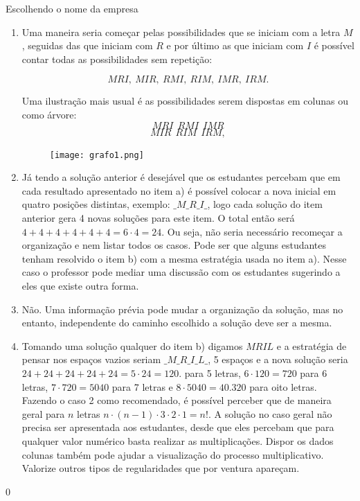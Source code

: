 \begin{answer}{Escolhendo o nome da empresa}
{
\begin{enumerate}
\item Uma maneira seria começar pelas possibilidades que se iniciam com a letra $M$, seguidas das que iniciam com $R$ e por último as que iniciam com $I$ é possível contar todas as possibilidades sem repetição: 
                    
$$MRI, ~ MIR, ~ RMI, ~ RIM, ~ IMR, ~ IRM.$$

Uma ilustração mais usual é as possibilidades serem dispostas em colunas ou como árvore: 
$$MRI ~~ RMI~~IMR$$ 
$$MIR ~~ RIM~~IRM ,$$                     
\begin{figure}[H]
\centering

\texttt{[image: grafo1.png]}
\end{figure}
\item Já tendo a solução anterior é desejável que os estudantes percebam que em cada resultado apresentado no item a) é possível colocar a nova inicial em quatro posições distintas, exemplo: 
$\_ M \_ R\_ I \_ $, logo cada solução do item anterior gera 4 novas soluções para este item. O total então será $4+4+4+4+4+4= 6 \cdot 4=24$. Ou seja, não seria necessário recomeçar a organização e nem listar todos os casos. Pode ser que alguns estudantes tenham resolvido o item b) com a mesma estratégia usada no item a). Nesse caso o professor pode mediar uma discussão com os estudantes sugerindo a eles que existe outra forma. 

\item Não. Uma informação prévia pode mudar a organização da solução, mas no entanto, independente do caminho escolhido a solução deve ser a mesma. 

\item Tomando uma solução qualquer do item b) digamos $MRIL$ e a estratégia de pensar nos espaços vazios seriam $\_M\_R\_I\_L\_$,  5 espaços e a nova solução seria $24+24+24+24+24=5 \cdot 24=  120.$ para 5 letras, $6 \cdot 120= 720$ para 6 letras, $7\cdot 720=5040$ para 7 letras e $8 \cdot 5040= 40.320$ para oito letras. Fazendo o caso 2 como recomendado, é possível perceber que de maneira geral para $n$ letras 
$n \cdot (n-1) \cdot 3 \cdot 2 \cdot 1= n!$.
A solução no caso geral não precisa ser apresentada aos estudantes, desde que eles percebam que para qualquer valor numérico basta realizar as multiplicações.  Dispor os dados colunas também pode ajudar a visualização do processo multiplicativo. Valorize outros tipos de regularidades que por ventura apareçam.
\end{enumerate}
}{0}
\end{answer}

